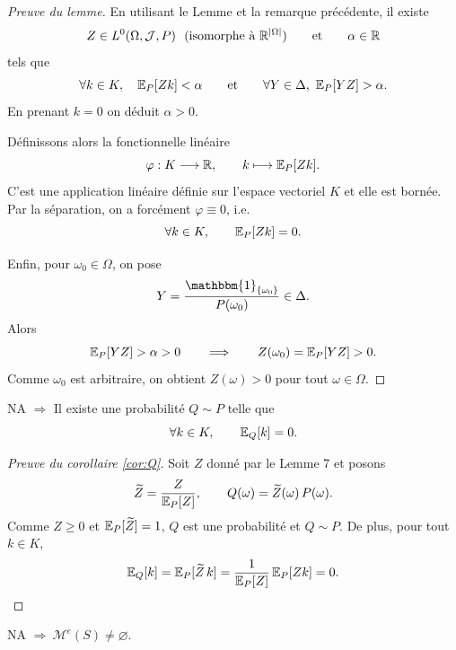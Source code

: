 \begin{proof}[Preuve du lemme]
En utilisant le Lemme  et la remarque précédente, il existe
\[
 Z\in L^0(\Omega,\mathcal{J},P)\ \ (\text{isomorphe à } \mathbb{R}^{|\Omega|})
 \qquad\text{et}\qquad
 \alpha\in\mathbb{R}
\]
tels que
\[
\forall k\in K,\quad \mathbb{E}_P[Zk]<\alpha
\qquad\text{et}\qquad
\forall Y\in\Delta,\ \mathbb{E}_P[YZ]>\alpha .
\]
En prenant $k=0$ on déduit $\alpha>0$.

Définissons alors la fonctionnelle linéaire
\[
\varphi:K\longrightarrow\mathbb{R},\qquad
k\longmapsto \mathbb{E}_P[Zk] .
\]
C'est une application linéaire définie sur l'espace vectoriel $K$ et elle est bornée.
Par la séparation, on a forcément $\varphi\equiv 0$, i.e.
\[
\forall k\in K,\qquad \mathbb{E}_P[Zk]=0.
\]

Enfin, pour $\omega_0\in\Omega$, on pose
\[
Y=\frac{\mathbbm{1}_{\{\omega_0\}}}{P(\omega_0)}\in\Delta.
\]
Alors
\[
\mathbb{E}_P[YZ]>\alpha>0
\qquad\Longrightarrow\qquad
Z(\omega_0)=\mathbb{E}_P[YZ]>0 .
\]
Comme $\omega_0$ est arbitraire, on obtient $Z(\omega)>0$ pour tout $\omega\in\Omega$.
\end{proof}

\begin{corollaire}\label{cor:Q}
NA $\Rightarrow$ Il existe une probabilité $Q\sim P$ telle que
\[
\forall k\in K,\qquad \mathbb{E}_Q[k]=0 .
\]
\end{corollaire}

\begin{proof}[Preuve du corollaire \ref{cor:Q}]
Soit $Z$ donné par le Lemme 7 et posons
\[
\widetilde Z=\frac{Z}{\mathbb{E}_P[Z]},
\qquad
Q(\omega)=\widetilde Z(\omega)\,P(\omega).
\]
Comme $Z\ge0$ et $\mathbb{E}_P[\widetilde Z]=1$, $Q$ est une probabilité et $Q\sim P$.
De plus, pour tout $k\in K$,
\[
\mathbb{E}_Q[k]=\mathbb{E}_P[\widetilde Z\,k]
=\frac{1}{\mathbb{E}_P[Z]}\,\mathbb{E}_P[Zk]=0 .
\]
\end{proof}

\begin{lemme}\label{lem:8}
NA $\Rightarrow\ \mathcal{M}^e(S)\neq\varnothing$. 
\end{lemme}


